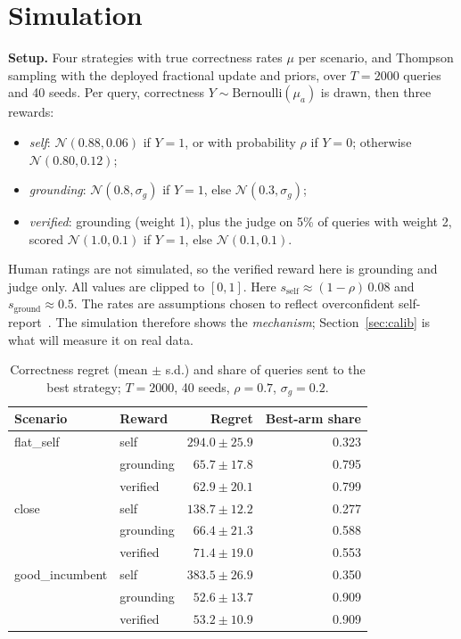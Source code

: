 \documentclass[conference]{IEEEtran}
\theoremstyle{definition}
\theoremstyle{remark}
\begin{document}
\section{Simulation}\label{sec:eval}
\textbf{Setup.} Four strategies with true correctness rates $\mu$ per scenario, and Thompson sampling with the deployed fractional update and priors, over $T=2000$ queries and 40 seeds. Per query, correctness $Y\sim\mathrm{Bernoulli}(\mu_a)$ is drawn, then three rewards:
\begin{itemize}
\item \emph{self}: $\mathcal N(0.88,0.06)$ if $Y=1$, or with probability $\rho$ if $Y=0$; otherwise $\mathcal N(0.80,0.12)$;
\item \emph{grounding}: $\mathcal N(0.8,\sigma_g)$ if $Y=1$, else $\mathcal N(0.3,\sigma_g)$;
\item \emph{verified}: grounding (weight 1), plus the judge on 5\% of queries with weight 2, scored $\mathcal N(1.0,0.1)$ if $Y=1$, else $\mathcal N(0.1,0.1)$.
\end{itemize}
Human ratings are not simulated, so the verified reward here is grounding and judge only.
All values are clipped to $[0,1]$. Here $s_{\text{self}}\approx(1-\rho)\,0.08$ and $s_{\text{ground}}\approx0.5$. The rates are assumptions chosen to reflect overconfident self-report~\cite{xiong2024}. The simulation therefore shows the \emph{mechanism}; Section~\ref{sec:calib} is what will measure it on real data.

\begin{table}[t]
\centering
\caption{Correctness regret (mean $\pm$ s.d.) and share of queries sent to the best strategy; $T=2000$, 40 seeds, $\rho=0.7$, $\sigma_g=0.2$.}
\label{tab:main}
\begin{tabular}{llrr}
\toprule
Scenario & Reward & Regret & Best-arm share\\
\midrule
flat\_self & self & $294.0\pm25.9$ & 0.323\\
 & grounding & $65.7\pm17.8$ & 0.795\\
 & verified & $62.9\pm20.1$ & 0.799\\
\midrule
close & self & $138.7\pm12.2$ & 0.277\\
 & grounding & $66.4\pm21.3$ & 0.588\\
 & verified & $71.4\pm19.0$ & 0.553\\
\midrule
good\_incumbent & self & $383.5\pm26.9$ & 0.350\\
 & grounding & $52.6\pm13.7$ & 0.909\\
 & verified & $53.2\pm10.9$ & 0.909\\
\bottomrule
\end{tabular}
\end{table}
\end{document}
